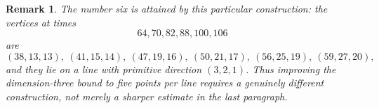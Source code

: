\documentclass[11pt]{article}
\newtheorem*{remark}{Remark}
\begin{document}
\begin{remark}\label{rem:d3-sharp-for-construction}
The number six is attained by this particular construction: the vertices at
times
\[
 64,70,82,88,100,106
\]
are
\[
 (38,13,13),\ (41,15,14),\ (47,19,16),\
 (50,21,17),\ (56,25,19),\ (59,27,20),
\]
and they lie on a line with primitive direction $(3,2,1)$.  Thus improving
the dimension-three bound to five points per line requires a genuinely
different construction, not merely a sharper estimate in the last paragraph.
\end{remark}
\end{document}
